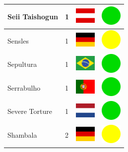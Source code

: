 \documentclass[12pt, a4paper, twoside]{report}
\begin{document}
\begin{center}
\begin{longtable}{|p{5cm}|p{2cm}|p{2cm}|p{2cm}|}
			Seii Taishogun & 1 & \includegraphics[width=1cm]{4x3/at} & \includegraphics[width=1cm]{likes/y} \\ \hline
			Sensles & 1 & \includegraphics[width=1cm]{4x3/de} & \includegraphics[width=1cm]{likes/m} \\ \hline
			Sepultura & 1 & \includegraphics[width=1cm]{4x3/br} & \includegraphics[width=1cm]{likes/y} \\ \hline
			Serrabulho & 1 & \includegraphics[width=1cm]{4x3/pt} & \includegraphics[width=1cm]{likes/y} \\ \hline
			Severe Torture & 1 & \includegraphics[width=1cm]{4x3/nl} & \includegraphics[width=1cm]{likes/y} \\ \hline
			Shambala & 2 & \includegraphics[width=1cm]{4x3/de} & \includegraphics[width=1cm]{likes/m} \\ \hline

\end{longtable}
\end{center}
\end{document}
